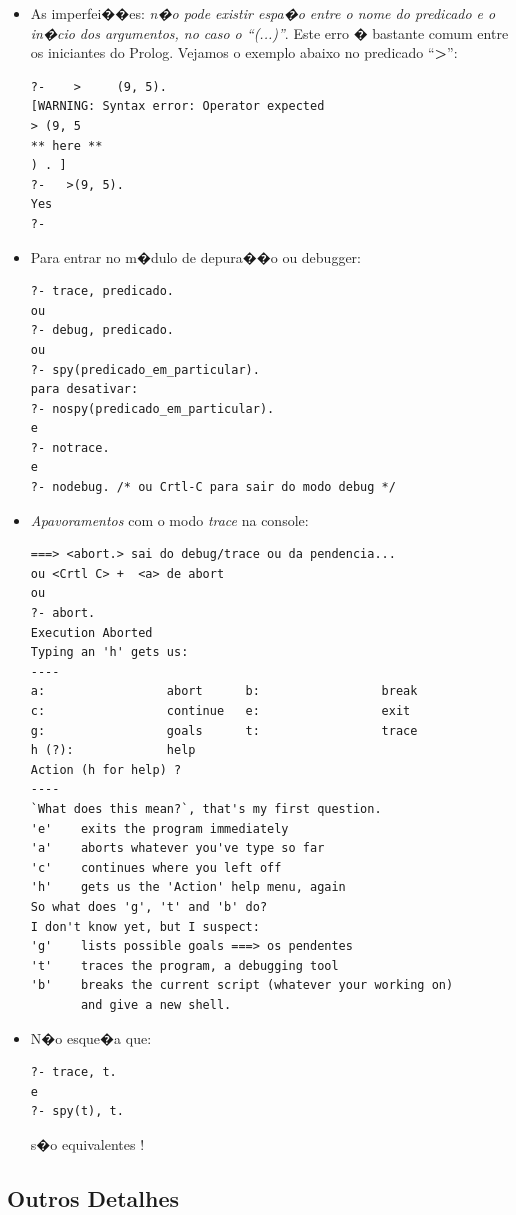 \documentclass[final,a4paper]{article}
\begin{document}
\begin{itemize}
\item As imperfei��es: {\em n�o
 pode existir espa�o entre o
 nome do predicado
 e o in�cio dos argumentos, no caso o ``(...)''}. Este
 erro � bastante comum entre os iniciantes do Prolog.
 Vejamos o exemplo abaixo no predicado  ``{\bf >}'':
\begin{verbatim}
?-    >     (9, 5).
[WARNING: Syntax error: Operator expected
> (9, 5
** here **
) . ]
?-   >(9, 5).
Yes
?-
\end{verbatim}

\item Para entrar no m�dulo de depura��o ou debugger:
\begin{verbatim}
?- trace, predicado.
ou
?- debug, predicado.
ou
?- spy(predicado_em_particular).
para desativar:
?- nospy(predicado_em_particular).
e
?- notrace.
e
?- nodebug. /* ou Crtl-C para sair do modo debug */
\end{verbatim}

\item {\em Apavoramentos} com o modo {\em trace} na console:
{\small
\begin{verbatim}
===> <abort.> sai do debug/trace ou da pendencia...
ou <Crtl C> +  <a> de abort
ou
?- abort.
Execution Aborted
Typing an 'h' gets us:
----
a:                 abort      b:                 break
c:                 continue   e:                 exit
g:                 goals      t:                 trace
h (?):             help
Action (h for help) ?
----
`What does this mean?`, that's my first question.
'e'    exits the program immediately
'a'    aborts whatever you've type so far
'c'    continues where you left off
'h'    gets us the 'Action' help menu, again
So what does 'g', 't' and 'b' do?
I don't know yet, but I suspect:
'g'    lists possible goals ===> os pendentes
't'    traces the program, a debugging tool
'b'    breaks the current script (whatever your working on)
       and give a new shell.
\end{verbatim}
}
\item N�o esque�a que:
\begin{verbatim}
?- trace, t.
e
?- spy(t), t.
\end{verbatim}
s�o equivalentes !

\end{itemize}
\newpage
\subsection {Outros Detalhes}
\end{document}
